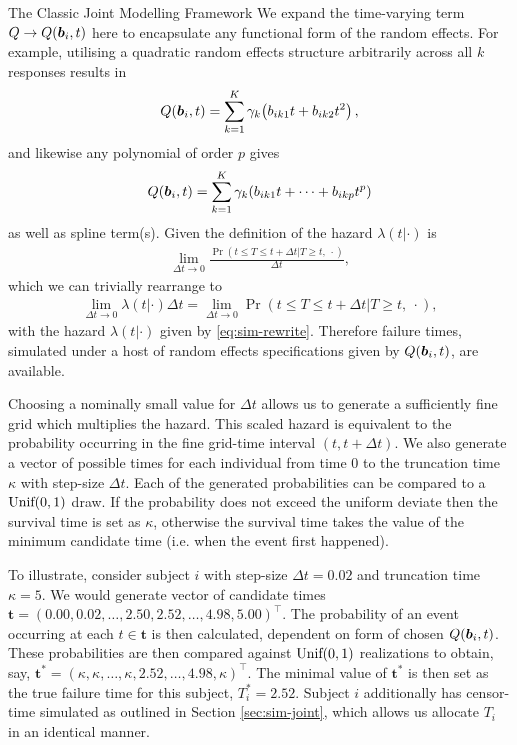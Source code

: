 \begin{chapter}{\label{cha:methods-classic}The Classic Joint Modelling Framework}
  We expand the time-varying term $Q\rightarrow Q(\bm{b}_i, t)$ here to encapsulate any functional form of the random effects. For example, utilising a quadratic random effects structure arbitrarily across all $k$ responses results in 
  \begin{align*}
    Q(\bm{b}_i, t)=\sum_{k=1}^K\gamma_k\!\left( b_{ik1}t+b_{ik2}t^2\right), 
  \end{align*}
  and likewise any polynomial of order $p$ gives
  \begin{align*}
    Q(\bm{b}_i,t)=\sum_{k=1}^K\gamma_k\!\left( b_{ik1}t+\dots+b_{ikp}t^p\right)    
  \end{align*}
  as well as \eg spline term(s). Given the definition of the hazard $\lambda(t|\cdot)$ is 
  \begin{align}
      \underset{\Delta t\rightarrow 0}{\lim}\frac{\Pr(t\le T\le t + \Delta t|T\ge t,\ \cdot)}{\Delta t},
  \label{eq:haz-def}
  \end{align}
  which we can trivially rearrange to
  \begin{align}
    \underset{\Delta t\rightarrow0}{\lim}\lambda(t|\cdot)\Delta t = 
    \underset{\Delta t\rightarrow0}{\lim}\Pr(t\le T\le t + \Delta t|T\ge t,\ \cdot),
    \label{eq:haz-def-dt}
  \end{align}
  with the hazard $\lambda(t|\cdot)$ given by \eqref{eq:sim-rewrite}. Therefore failure times, simulated under a host of random effects specifications given by $Q\!\left(\bm{b}_i,t\right)$, are available. 
  
  Choosing a nominally small value for $\Delta t$ allows us to generate a sufficiently fine grid which multiplies the hazard. This scaled hazard is equivalent to the probability occurring in the fine grid-time interval $(t, t + \Delta t)$. We also generate a vector of possible times for each individual from time $0$ to the truncation time $\kappa$ with step-size $\Delta t$. Each of the generated probabilities can be compared to a $\text{Unif}\!\left(0,1\right)$ draw. If the probability does not exceed the uniform deviate then the survival time is set as $\kappa$, otherwise the survival time takes the value of the minimum candidate time (i.e. when the event first happened).
  
  To illustrate, consider subject $i$ with step-size $\Delta t=0.02$ and truncation time $\kappa=5$. We would generate vector of candidate times $\bm{t}=(0.00, 0.02,\dots,2.50,2.52,\dots,4.98,5.00)^\top$. The probability of an event occurring at each $t\in\bm{t}$ is then calculated, dependent on form of chosen $Q(\bm{b}_i,t)$. These probabilities are then compared against $\text{Unif}\!\left(0,1\right)$ realizations to obtain, say, $\bm{t}^*=(\kappa,\kappa,\dots,\kappa,2.52,\dots,4.98,\kappa)^\top$. The minimal value of $\bm{t}^*$ is then set as the true failure time for this subject, $T_i^*=2.52$. Subject $i$ additionally has censor-time simulated as outlined in Section \ref{sec:sim-joint}, which allows us allocate $T_i$ in an identical manner.
  

\end{chapter}
